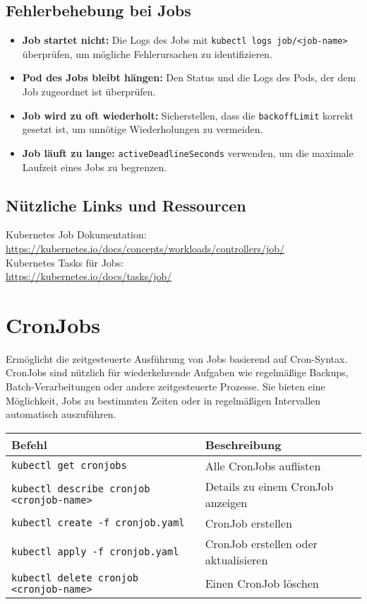 \subsection{Fehlerbehebung bei Jobs}
\begin{itemize}
    \item \textbf{Job startet nicht:} Die Logs des Jobs mit \texttt{kubectl logs job/<job-name>} überprüfen, um mögliche Fehlerursachen zu identifizieren.
    \item \textbf{Pod des Jobs bleibt hängen:} Den Status und die Logs des Pods, der dem Job zugeordnet ist überprüfen.
    \item \textbf{Job wird zu oft wiederholt:} Sicherstellen, dass die \texttt{backoffLimit} korrekt gesetzt ist, um unnötige Wiederholungen zu vermeiden.
    \item \textbf{Job läuft zu lange:} \texttt{activeDeadlineSeconds} verwenden, um die maximale Laufzeit eines Jobs zu begrenzen.
\end{itemize}

\subsection{Nützliche Links und Ressourcen}
Kubernetes Job Dokumentation:\\
\url{https://kubernetes.io/docs/concepts/workloads/controllers/job/}\\
Kubernetes Tasks für Jobs:\\
\url{https://kubernetes.io/docs/tasks/job/}\\




\section{CronJobs}
Ermöglicht die zeitgesteuerte Ausführung von Jobs basierend auf Cron-Syntax. CronJobs sind nützlich für wiederkehrende Aufgaben wie regelmäßige Backups, Batch-Verarbeitungen oder andere zeitgesteuerte Prozesse. Sie bieten eine Möglichkeit, Jobs zu bestimmten Zeiten oder in regelmäßigen Intervallen automatisch auszuführen.\\

\noindent
\begin{tabular}{|l|l|}
\hline
\textbf{Befehl} & \textbf{Beschreibung} \\
\hline
\texttt{kubectl get cronjobs} & Alle CronJobs auflisten \\
\texttt{kubectl describe cronjob <cronjob-name>} & Details zu einem CronJob anzeigen \\
\texttt{kubectl create -f cronjob.yaml} & CronJob erstellen\\
\texttt{kubectl apply -f cronjob.yaml} & CronJob erstellen oder aktualisieren\\
\texttt{kubectl delete cronjob <cronjob-name>} & Einen CronJob löschen \\
\hline
\end{tabular}
